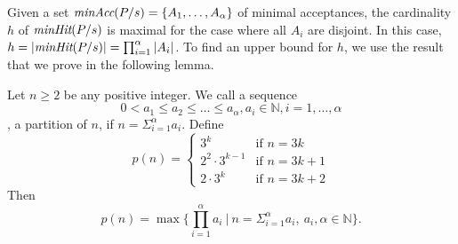 Given a set $\text{\it minAcc}(P/s) = \{ A_1,\dots, A_\alpha \}$ of   minimal
acceptances, the cardinality $h$ of $\text{\it minHit}(P/s)$ is maximal for the case
where all $A_i$ are disjoint. In this case,  $h=|\text{\it minHit}(P/s)| =
\prod_{i=1}^\alpha|A_i|$. To find an upper bound for $h$, we use the result
that we prove in the following lemma.
%
\begin{lemma}\label{lemma:minhitmax}
Let $n\ge 2$ be any positive integer. We call a sequence
%
$$0 < a_1\le a_2\le \ldots\le  a_{\alpha}, a_i\in \mathbb{N}, i=1,\dots, \alpha$$,
%
a partition of $n$, if $n=\Sigma_{i=1}^{\alpha}a_i$. Define
%
$$p(n)=\begin{cases} 3^k &\text{if}\,\, n=3k\\ 2^2\cdot 3^{k-1} &\text{if}\,\, n=3k+1\\2\cdot 3^{k} &\text{if}\,\, n=3k+2\end{cases}$$
Then  $$p(n)=\max\big\{\prod_{i=1}^{\alpha}a_i~|~n=\Sigma_{i=1}^{\alpha}a_i,\ a_i,
\alpha\in \mathbb{N}\big\}.$$
%
\end{lemma}
